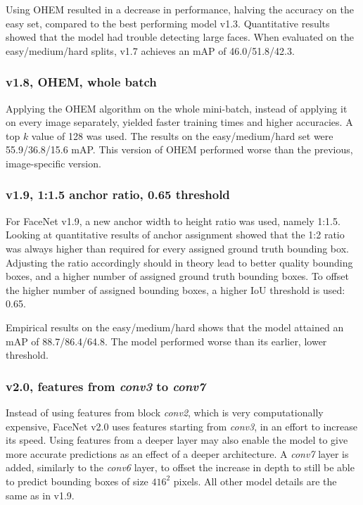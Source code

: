 \documentclass[a4paper, twoside]{article}
\begin{document}
Using OHEM resulted in a decrease in performance, halving the accuracy on the easy set, compared to the best performing model v1.3. Quantitative results showed that the model had trouble detecting large faces. When evaluated on the easy/medium/hard splits, v1.7 achieves an mAP of 46.0/51.8/42.3.

\subsubsection{v1.8, OHEM, whole batch}
Applying the OHEM algorithm on the whole mini-batch, instead of applying it on every image separately, yielded faster training times and higher accuracies. A top $k$ value of 128 was used. The results on the easy/medium/hard set were 55.9/36.8/15.6 mAP. This version of OHEM performed worse than the previous, image-specific version.

\subsubsection{v1.9, 1:1.5 anchor ratio, 0.65 threshold}
For FaceNet v1.9, a new anchor width to height ratio was used, namely 1:1.5. Looking at quantitative results of anchor assignment showed that the 1:2 ratio was always higher than required for every assigned ground truth bounding box. Adjusting the ratio accordingly should in theory lead to better quality bounding boxes, and a higher number of assigned ground truth bounding boxes. To offset the higher number of assigned bounding boxes, a higher IoU threshold is used: 0.65.

Empirical results on the easy/medium/hard shows that the model attained an mAP of 88.7/86.4/64.8. The model performed worse than its earlier, lower threshold.

\subsubsection{v2.0, features from \textit{conv3} to \textit{conv7}}
Instead of using features from block \textit{conv2}, which is very computationally expensive, FaceNet v2.0 uses features starting from \textit{conv3}, in an effort to increase its speed. Using features from a deeper layer may also enable the model to give more accurate predictions as an effect of a deeper architecture. A \textit{conv7} layer is added, similarly to the \textit{conv6} layer, to offset the increase in depth to still be able to predict bounding boxes of size $416^2$ pixels. All other model details are the same as in v1.9.
\end{document}
